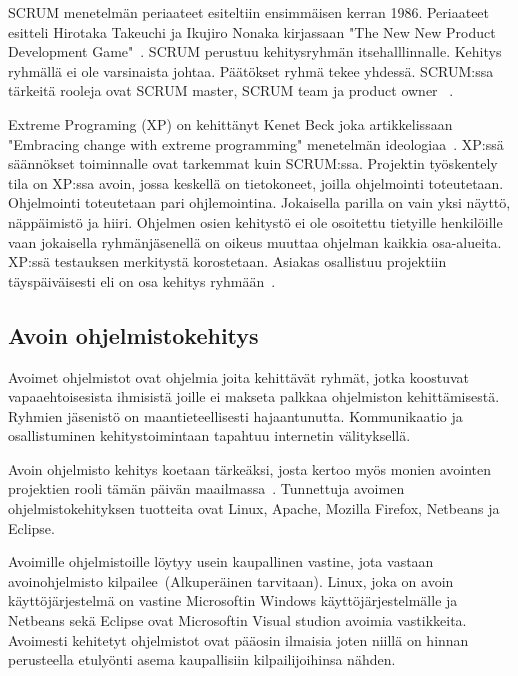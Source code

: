 \documentclass[finnish]{tktltiki2}
\theoremstyle{definition}
\theoremstyle{remark}
\begin{document}
 SCRUM menetelmän periaateet esiteltiin ensimmäisen kerran 1986. Periaateet esitteli Hirotaka Takeuchi ja Ikujiro Nonaka kirjassaan "The New New Product Development Game"~\cite{nonaka1986new}. SCRUM perustuu kehitysryhmän itsehalllinnalle. Kehitys ryhmällä ei ole varsinaista johtaa. Päätökset ryhmä tekee yhdessä. SCRUM:ssa tärkeitä rooleja ovat SCRUM master, SCRUM team ja product owner ~\cite{schwaber2002agile}. 

Extreme Programing (XP) on kehittänyt Kenet Beck joka artikkelissaan "Embracing change with extreme programming" menetelmän ideologiaa~\cite{796139}. XP:ssä säännökset toiminnalle ovat tarkemmat kuin SCRUM:ssa. Projektin työskentely tila on XP:ssa avoin, jossa keskellä on tietokoneet, joilla ohjelmointi toteutetaan. Ohjelmointi toteutetaan pari ohjlemointina. Jokaisella parilla on vain yksi näyttö, näppäimistö ja hiiri. Ohjelmen osien kehitystö ei ole osoitettu tietyille henkilöille vaan jokaisella ryhmänjäsenellä on oikeus muuttaa ohjelman kaikkia osa-alueita. XP:ssä testauksen merkitystä korostetaan. Asiakas osallistuu projektiin täyspäiväisesti eli on osa kehitys ryhmään~\cite{796139}.  



\subsection{Avoin ohjelmistokehitys}

Avoimet ohjelmistot ovat ohjelmia joita kehittävät ryhmät, jotka koostuvat vapaaehtoisesista ihmisistä joille ei makseta palkkaa ohjelmiston kehittämisestä. Ryhmien jäsenistö on maantieteellisesti hajaantunutta. Kommunikaatio ja osallistuminen kehitystoimintaan tapahtuu internetin välityksellä.

Avoin ohjelmisto kehitys koetaan tärkeäksi, josta kertoo myös monien avointen projektien rooli tämän päivän maailmassa~\cite{Li:2006:MOS:1125170.1125182}. Tunnettuja avoimen ohjelmistokehityksen tuotteita ovat Linux, Apache, Mozilla Firefox, Netbeans ja Eclipse. 

Avoimille ohjelmistoille löytyy usein kaupallinen vastine, jota vastaan avoinohjelmisto kilpailee~\cite{Luther:2008:LOC:1460563.1460619}(Alkuperäinen tarvitaan). Linux, joka on avoin käyttöjärjestelmä on vastine Microsoftin Windows käyttöjärjestelmälle ja Netbeans sekä Eclipse ovat Microsoftin Visual studion avoimia vastikkeita. Avoimesti kehitetyt ohjelmistot ovat pääosin ilmaisia joten niillä on hinnan perusteella etulyönti asema kaupallisiin kilpailijoihinsa nähden. 
\end{document}
